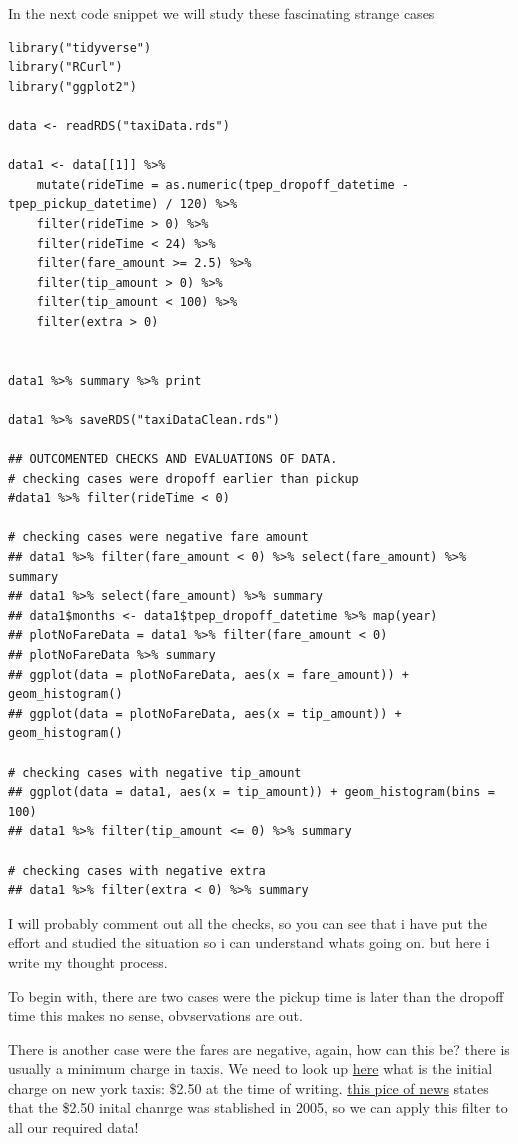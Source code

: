 \documentclass[11pt]{article}
\begin{document}
In the next code snippet we will study these fascinating strange cases

\begin{verbatim}
library("tidyverse")
library("RCurl")
library("ggplot2")

data <- readRDS("taxiData.rds")

data1 <- data[[1]] %>%
    mutate(rideTime = as.numeric(tpep_dropoff_datetime - tpep_pickup_datetime) / 120) %>%
    filter(rideTime > 0) %>%
    filter(rideTime < 24) %>%
    filter(fare_amount >= 2.5) %>%
    filter(tip_amount > 0) %>%
    filter(tip_amount < 100) %>%
    filter(extra > 0)


data1 %>% summary %>% print

data1 %>% saveRDS("taxiDataClean.rds")

## OUTCOMENTED CHECKS AND EVALUATIONS OF DATA.
# checking cases were dropoff earlier than pickup
#data1 %>% filter(rideTime < 0)

# checking cases were negative fare amount
## data1 %>% filter(fare_amount < 0) %>% select(fare_amount) %>% summary
## data1 %>% select(fare_amount) %>% summary
## data1$months <- data1$tpep_dropoff_datetime %>% map(year)
## plotNoFareData = data1 %>% filter(fare_amount < 0)
## plotNoFareData %>% summary
## ggplot(data = plotNoFareData, aes(x = fare_amount)) + geom_histogram()
## ggplot(data = plotNoFareData, aes(x = tip_amount)) + geom_histogram()

# checking cases with negative tip_amount
## ggplot(data = data1, aes(x = tip_amount)) + geom_histogram(bins = 100)
## data1 %>% filter(tip_amount <= 0) %>% summary

# checking cases with negative extra
## data1 %>% filter(extra < 0) %>% summary
\end{verbatim}
I will probably comment out all the checks, so you can see that i have put the effort
and studied the situation so i can understand whats going on. but here i write my
thought process.

To begin with, there are two cases were the pickup time is later than the dropoff time
this makes no sense, obvservations are out.

There is another case were the fares are negative, again, how can this be? there is usually
a minimum charge in taxis. We need to look up \href{https://www1.nyc.gov/site/tlc/passengers/taxi-fare.page}{here} what
is the initial charge on new york taxis: \$2.50 at the time of writing.
\href{https://nymag.com/nymetro/urban/features/taxi/n\_20286/}{this pice of news} states that the \$2.50 inital chanrge was stablished in 2005, so we can
apply this filter to all our required data!
\end{document}
